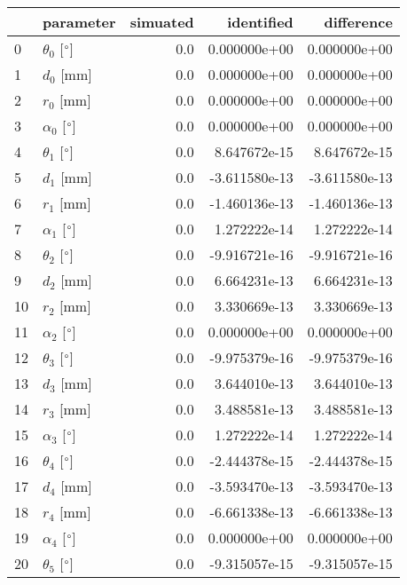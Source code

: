 \documentclass{standalone}%
\begin{document}
%
\normalsize%
\begin{tabular}{llrrr}
\toprule
{} &                 parameter & simuated &    identified &    difference \\
\midrule
0  &  $\theta_{0}$ [$\degree$] &      0.0 &  0.000000e+00 &  0.000000e+00 \\
1  &              $d_{0}$ [mm] &      0.0 &  0.000000e+00 &  0.000000e+00 \\
2  &              $r_{0}$ [mm] &      0.0 &  0.000000e+00 &  0.000000e+00 \\
3  &  $\alpha_{0}$ [$\degree$] &      0.0 &  0.000000e+00 &  0.000000e+00 \\
4  &  $\theta_{1}$ [$\degree$] &      0.0 &  8.647672e-15 &  8.647672e-15 \\
5  &              $d_{1}$ [mm] &      0.0 & -3.611580e-13 & -3.611580e-13 \\
6  &              $r_{1}$ [mm] &      0.0 & -1.460136e-13 & -1.460136e-13 \\
7  &  $\alpha_{1}$ [$\degree$] &      0.0 &  1.272222e-14 &  1.272222e-14 \\
8  &  $\theta_{2}$ [$\degree$] &      0.0 & -9.916721e-16 & -9.916721e-16 \\
9  &              $d_{2}$ [mm] &      0.0 &  6.664231e-13 &  6.664231e-13 \\
10 &              $r_{2}$ [mm] &      0.0 &  3.330669e-13 &  3.330669e-13 \\
11 &  $\alpha_{2}$ [$\degree$] &      0.0 &  0.000000e+00 &  0.000000e+00 \\
12 &  $\theta_{3}$ [$\degree$] &      0.0 & -9.975379e-16 & -9.975379e-16 \\
13 &              $d_{3}$ [mm] &      0.0 &  3.644010e-13 &  3.644010e-13 \\
14 &              $r_{3}$ [mm] &      0.0 &  3.488581e-13 &  3.488581e-13 \\
15 &  $\alpha_{3}$ [$\degree$] &      0.0 &  1.272222e-14 &  1.272222e-14 \\
16 &  $\theta_{4}$ [$\degree$] &      0.0 & -2.444378e-15 & -2.444378e-15 \\
17 &              $d_{4}$ [mm] &      0.0 & -3.593470e-13 & -3.593470e-13 \\
18 &              $r_{4}$ [mm] &      0.0 & -6.661338e-13 & -6.661338e-13 \\
19 &  $\alpha_{4}$ [$\degree$] &      0.0 &  0.000000e+00 &  0.000000e+00 \\
20 &  $\theta_{5}$ [$\degree$] &      0.0 & -9.315057e-15 & -9.315057e-15 \\

\end{tabular}
\end{document}
